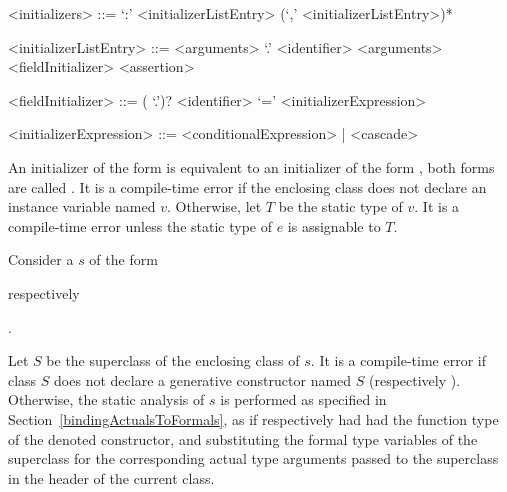 \documentclass[makeidx]{article}
\begin{document}
\begin{grammar}
<initializers> ::= `:' <initializerListEntry> (`,' <initializerListEntry>)*

<initializerListEntry> ::= \SUPER{} <arguments>
  \alt \SUPER{} `.' <identifier> <arguments>
  \alt <fieldInitializer>
  \alt <assertion>

<fieldInitializer> ::= \gnewline{}
  (\THIS{} `.')? <identifier> `=' <initializerExpression>

<initializerExpression> ::= <conditionalExpression> | <cascade>
\end{grammar}

\LMHash{}%
An initializer of the form  is equivalent to
an initializer of the form ,
both forms are called .
It is a compile-time error if the enclosing class does not declare an instance variable named $v$.
Otherwise, let $T$ be the static type of $v$.
It is a compile-time error unless the static type of $e$ is assignable to $T$.

\LMHash{}%
Consider a  $s$ of the form

respectively

.

\noindent{}%
Let $S$ be the superclass of the enclosing class of $s$.
It is a compile-time error if class $S$ does not declare a generative constructor named $S$ (respectively ).
Otherwise, the static analysis of $s$ is performed as specified in Section~\ref{bindingActualsToFormals},
as if \code{\SUPER{}} respectively 
had had the function type of the denoted constructor,
and substituting the formal type variables of the superclass
for the corresponding actual type arguments passed to the superclass
in the header of the current class.
\end{document}
